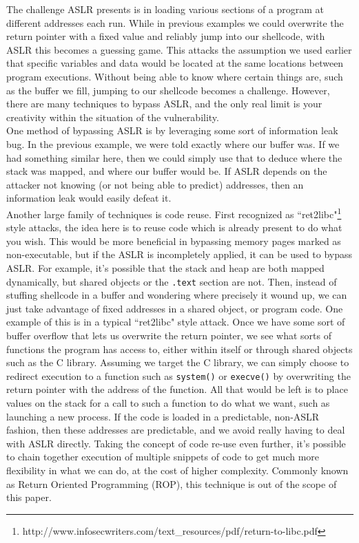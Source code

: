The challenge ASLR presents is in loading various sections of a 
program at different addresses each run. While in previous examples
we could overwrite the return pointer with a fixed value and reliably
jump into our shellcode, with ASLR this becomes a guessing game.
This attacks the assumption we used earlier that specific variables
and data would be located at the same locations between program
executions. Without being able to know where certain things are, 
such as the buffer we fill, jumping to our shellcode becomes a
challenge. However, there are many techniques to bypass
ASLR, and the only real limit is your creativity within the
situation of the vulnerability.\\

One method of bypassing ASLR is by leveraging some sort of
information leak bug. In the previous example, we were told
exactly where our buffer was. If we had something similar here, 
then we could simply use that to deduce where the stack was
mapped, and where our buffer would be. If ASLR depends on the 
attacker not knowing (or not being able to predict) addresses, 
then an information leak would easily defeat it.\\

Another large family of techniques is code reuse. First recognized
as ``ret2libc"\footnote{http://www.infosecwriters.com/text\_resources/pdf/return-to-libc.pdf}
style attacks, the idea here is to reuse code
which is already present to do what you wish. This would be 
more beneficial in bypassing memory pages marked as non-executable,
but if the ASLR is incompletely applied, it can be used to bypass
ASLR. For example, it's possible that the stack and heap are both
mapped dynamically, but shared objects or the \texttt{.text} section are not.
Then, instead of stuffing shellcode in a buffer and wondering where
precisely it wound up, we can just take advantage of fixed
addresses in a shared object, or program code. One example of this
is in a typical ``ret2libc" style attack. Once we have some
sort of buffer overflow that lets us overwrite the return pointer,
we see what sorts of functions the program has access to, either
within itself or through shared objects such as the C library.
Assuming we target the C library, we can simply choose to redirect
execution to a function such as \texttt{system()} or \texttt{execve()}
by overwriting the return pointer with the address of the function.
All that would be left is to place values on the stack 
for a call to such a function to do what we want, such as
launching a new process. If the code is loaded in a predictable, 
non-ASLR fashion, then these addresses are predictable, and
we avoid really having to deal with ASLR directly. Taking the concept
of code re-use even further, it's possible to chain together
execution of multiple snippets of code to get much more flexibility
in what we can do, at the cost of higher complexity. Commonly known
as Return Oriented Programming (ROP), this technique is out of the 
scope of this paper.\\

